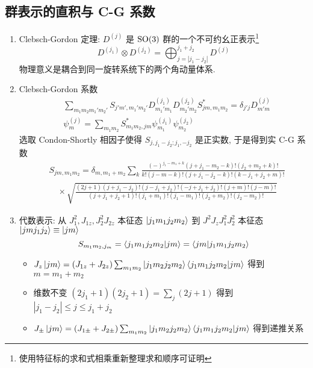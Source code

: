 \documentclass[12pt,a4paper]{article}%
\numberwithin{equation}{section}%
\begin{document}
\subsection{群表示的直积与 C-G 系数} %
\label{sub:prod_of_repr}
\begin{enumerate}
	\item Clebsch-Gordon 定理: $D^{(j)}$ 是 $\mathrm{SO}(3)$ 群的一个不可约幺正表示\footnote{使用特征标的求和式相乘重新整理求和顺序可证明}
	\begin{equation}
		D^{(j_1)}\otimes D^{(j_2)} = \bigoplus_{j = |j_1-j_2|}^{j_1+j_2} D^{(j)}
	\end{equation}
	物理意义是耦合到同一旋转系统下的两个角动量体系. 
	\item Clebsch-Gordon 系数
	\begin{align}
		&\sum_{m_1m_2m_1'm_2'} S_{j'm',m_1'm_2'} D^{(j_1)}_{m_1'm_1}D^{(j_2)}_{m_2'm_2}S^*_{jm,m_1m_2} = \delta_{j'j}D_{m'm}^{(j)} \\
		&\psi^{(j)}_m = \sum_{m_1m_2} S^*_{m_1m_2, jm}\psi^{(j_1)}_{m_1}\psi^{(j_2)}_{m_2}
	\end{align}
	选取 Condon-Shortly 相因子使得 $S_{j,j_1-j_2;j_1,-j_2}$ 是正实数, 于是得到实 C-G 系数
	\begin{equation}
		\begin{split}
			&S_{jm,m_1m_2} = \delta_{m,m_1+m_2}\sum_k\frac{(-)^{j_1-m_1+k}(j+j_1-m_2-k)!(j_2+m_2+k)!}{k!(j-m-k)!(j+j_1-j_2-k)!(k-j_1+j_2+m)!} \\
			&\quad\times\sqrt{\frac{(2j+1)(j+j_1-j_2)!(j-j_1+j_2)!(-j+j_1+j_2)!(j+m)!(j-m)!}{(j+j_1+j_2+1)!(j_1+m_1)!(j_1-m_1)!(j_2+m_2)!(j_2-m_2)!}}
		\end{split}
	\end{equation}
	\item 代数表示: 从 $J_1^2, J_{1z}, J_2^2 J_{2z}$ 本征态 $\ket{j_1m_1j_2m_2}$ 到 $J^2 J_z J_1^2 J_2^2$ 本征态 $\ket{jmj_1j_2}\equiv\ket{jm}$
	\begin{equation}
		S_{m_1m_2,j_m} = \braket{j_1m_1j_2m_2|jm} = \braket{jm|j_1m_1j_2m_2}
	\end{equation}
	\begin{itemize}
		\item $J_z\ket{jm} = (J_{1z} + J_{2z})\sum_{m_1m_2}\ket{j_1m_2j_2m_2}\braket{j_1m_1j_2m_2|jm}$ 得到 $m = m_1+m_2$
		\item 维数不变 $(2j_1 + 1)(2j_2+1) = \sum_j (2j+1)$ 得到 $|j_1-j_2|\le j \le j_1 + j_2$
		\item $J_{\pm}\ket{jm} = (J_{1\pm} + J_{2\pm})\sum_{m_1m_2}\ket{j_1m_2j_2m_2}\braket{j_1m_1j_2m_2|jm}$ 得到递推关系

\end{itemize}
\end{enumerate}
\end{document}

